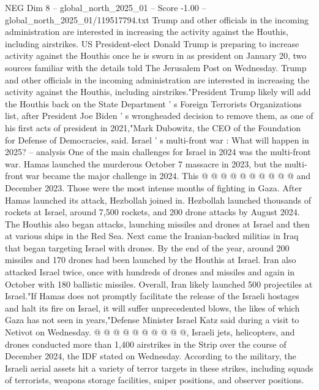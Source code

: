 \begin{textsample}{NEG Dim 8 – global\_north\_2025\_01 – Score -1.00 – global\_north\_2025\_01/119517794.txt}  \label{ex:f8_neg_169}
Trump and other officials in the incoming administration are interested in increasing the activity against the Houthis, including airstrikes.
US President-elect Donald Trump is preparing to increase activity against the Houthis once he is sworn in as president on January 20, two sources familiar with the details told The Jerusalem Post on Wednesday.
Trump and other officials in the incoming administration are interested in increasing the activity against the Houthis, including airstrikes."President Trump likely will add the Houthis back on the State Department ' s Foreign Terrorists Organizations list, after President Joe Biden ' s wrongheaded decision to remove them, as one of his first acts of president in 2021,"Mark Dubowitz, the CEO of the Foundation for Defense of Democracies, said.
Israel ' s multi-front war : What will happen in 2025? -- analysis One of the main challenges for Israel in 2024 was the multi-front war.
Hamas launched the murderous October 7 massacre in 2023, but the multi-front war became the major challenge in 2024.
This @ @ @ @ @ @ @ @ @ @ and December 2023.
Those were the most intense months of fighting in Gaza.
After Hamas launched its attack, Hezbollah joined in.
Hezbollah launched thousands of rockets at Israel, around 7,500 rockets, and 200 drone attacks by August 2024.
The Houthis also began attacks, launching missiles and drones at Israel and then at various ships in the Red Sea.
Next came the Iranian-backed militias in Iraq that began targeting Israel with drones.
By the end of the year, around 200 missiles and 170 drones had been launched by the Houthis at Israel.
Iran also attacked Israel twice, once with hundreds of drones and missiles and again in October with 180 ballistic missiles.
Overall, Iran likely launched 500 projectiles at Israel."If Hamas does not promptly facilitate the release of the Israeli hostages and halt its fire on Israel, it will suffer unprecedented blows, the likes of which Gaza has not seen in years,"Defense Minister Israel Katz said during a visit to Netivot on Wednesday. @ @ @ @ @ @ @ @ @ @, Israeli jets, helicopters, and drones conducted more than 1,400 airstrikes in the Strip over the course of December 2024, the IDF stated on Wednesday.
According to the military, the Israeli aerial assets hit a variety of terror targets in these strikes, including squads of terrorists, weapons storage facilities, sniper positions, and observer positions.

\end{textsample}
